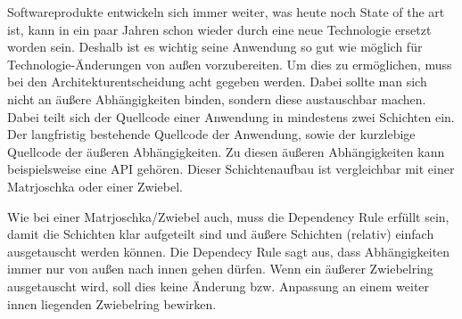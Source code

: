Softwareprodukte entwickeln sich immer weiter, was heute noch State of the art ist, kann in ein paar Jahren schon wieder durch eine neue Technologie ersetzt worden sein. Deshalb ist es wichtig seine Anwendung so gut wie möglich für Technologie-Änderungen von außen vorzubereiten. Um dies zu ermöglichen, muss bei den Architekturentscheidung acht gegeben werden. Dabei sollte man sich nicht an äußere Abhängigkeiten binden, sondern diese austauschbar machen. Dabei teilt sich der Quellcode einer Anwendung in mindestens zwei Schichten ein. Der langfristig bestehende Quellcode der Anwendung, sowie der kurzlebige Quellcode der äußeren Abhängigkeiten. Zu diesen äußeren Abhängigkeiten kann beispielsweise eine API gehören. Dieser Schichtenaufbau ist vergleichbar mit einer Matrjoschka oder einer Zwiebel.

Wie bei einer Matrjoschka/Zwiebel auch, muss die Dependency Rule erfüllt sein, damit die Schichten klar aufgeteilt sind und äußere Schichten (relativ) einfach ausgetauscht werden können. Die Dependecy Rule sagt aus, dass Abhängigkeiten immer nur von außen nach innen gehen dürfen. Wenn ein äußerer Zwiebelring ausgetauscht wird, soll dies keine Änderung bzw. Anpassung an einem weiter innen liegenden Zwiebelring bewirken.

